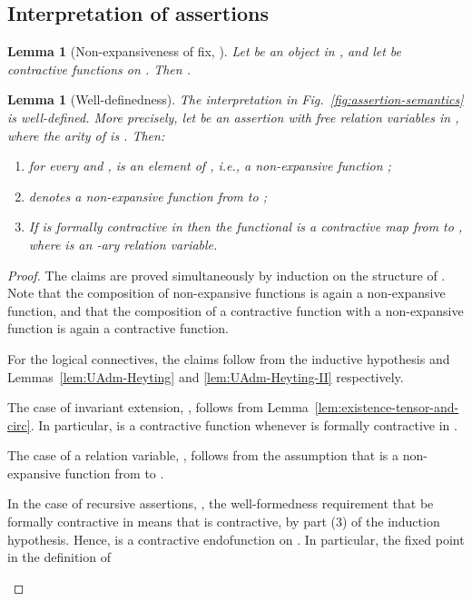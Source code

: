 \documentclass{LMCS}
\newtheorem{lemma}[theorem]{Lemma}
\theoremstyle{remark}
\begin{document}
\begin{figure*}[t]
\subsection{Interpretation of assertions}
\label{subsec:app:interpretation-assertions}

\begin{lemma}[Non-expansiveness of fix, \cite{Birkedal:Stovring:Thamsborg:09}]
\label{lem:fix-non-expansiveness}
Let  be an object in , and let  be contractive functions on . 
Then . 
\end{lemma}

\begin{lemma}[Well-definedness]
The interpretation in Fig.~\ref{fig:assertion-semantics} is well-defined. More precisely, let  be an assertion with free relation variables in , where the arity of  is . Then:
\begin{enumerate}
\item for every  and ,  is an element of , i.e., a non-expansive function ; 
\item  denotes a non-expansive function from  to ; 
\item   If  is formally contractive in  then the functional   is a contractive map from  to , where  is an -ary relation variable. 
\end{enumerate}
\end{lemma}

\begin{proof}
The claims are proved simultaneously by induction on the structure of . 
Note that the composition of non-expansive functions is again a non-expansive function, and that the composition of a contractive function with a non-expansive function is again a contractive function. 
\begin{iteMize}{}
\item For the logical connectives, the claims follow from the inductive hypothesis and Lemmas~\ref{lem:UAdm-Heyting} and \ref{lem:UAdm-Heyting-II} respectively.
 
\item The case of invariant extension, , follows from Lemma~\ref{lem:existence-tensor-and-circ}. In particular,  is  a contractive function whenever  is formally contractive in . 

\item The case of a relation variable, , follows from the assumption that  is a non-expansive function from  to . 

\item In the case of recursive assertions, , the well-formedness requirement that  be formally contractive in  means that 
 is contractive, by part (3) of the induction hypothesis. Hence,  is a contractive endofunction on . 
In particular,  the fixed point in the definition of 
 

\end{iteMize}
\end{proof}
\end{figure*}
\end{document}
